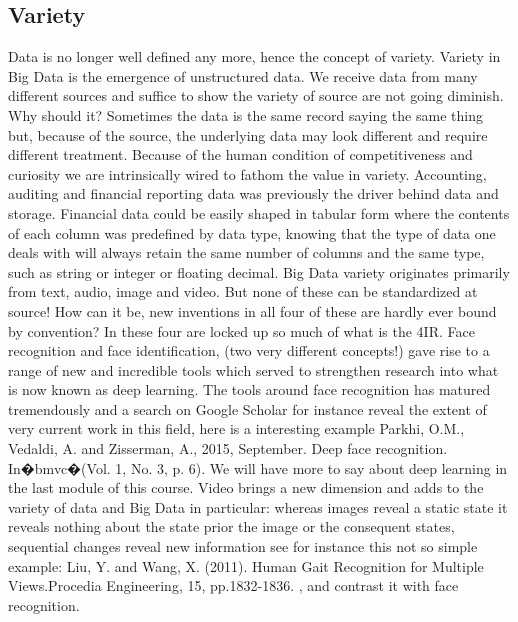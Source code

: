 \subsection{Variety}
Data is no longer well defined any more, hence the concept of variety.  Variety in Big Data is the emergence of unstructured data.  We receive data from many different sources and suffice to show the variety of source are not going diminish.  Why should it? Sometimes the data is the same record saying the same thing but, because of the source, the underlying data may look different and require different treatment.  Because of the human condition of competitiveness and curiosity we are intrinsically wired to fathom the value in variety.  Accounting, auditing and financial reporting data was previously the driver behind data and storage.  Financial data could be easily shaped in tabular form where the contents of each column was predefined by data type, knowing that the type of data one deals with will always retain the same number of columns and the same type, such as string or integer or floating decimal.  
Big Data variety originates primarily from text, audio, image and video.  But none of these can be standardized at source! How can it be, new inventions in all four of these are hardly ever bound by convention?  In these four are locked up so much of what is the 4IR.
 Face recognition and face identification, (two very different concepts!) gave rise to a range of new and incredible tools which served to strengthen research into what is now known as deep learning.
 The tools around face recognition has matured tremendously and a search on Google Scholar for instance reveal the extent of very current work in this field, here is a interesting example Parkhi, O.M., Vedaldi, A. and Zisserman, A., 2015, September. Deep face recognition. In�bmvc�(Vol. 1, No. 3, p. 6). We will have more to say about deep learning in the last module of this course.
 Video brings a new dimension and adds to the variety of data and Big Data in particular: whereas images reveal a static state it reveals nothing about the state prior the image or the consequent states, sequential changes reveal new information see for instance this not so simple example: Liu, Y. and Wang, X. (2011). Human Gait Recognition for Multiple Views.Procedia Engineering, 15, pp.1832-1836.  , and contrast it with face recognition.
